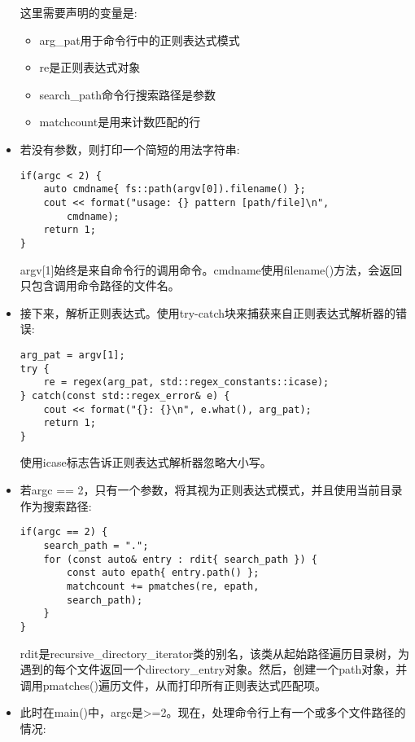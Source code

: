 \begin{itemize}
这里需要声明的变量是:

\begin{itemize}
\item
arg\_pat用于命令行中的正则表达式模式

\item
re是正则表达式对象

\item
search\_path命令行搜索路径是参数

\item
matchcount是用来计数匹配的行
\end{itemize}

\item 
若没有参数，则打印一个简短的用法字符串:

\begin{lstlisting}[style=styleCXX]
if(argc < 2) {
	auto cmdname{ fs::path(argv[0]).filename() };
	cout << format("usage: {} pattern [path/file]\n",
		cmdname);
	return 1;
}
\end{lstlisting}

argv[1]始终是来自命令行的调用命令。cmdname使用filename()方法，会返回只包含调用命令路径的文件名。

\item 
接下来，解析正则表达式。使用try-catch块来捕获来自正则表达式解析器的错误:

\begin{lstlisting}[style=styleCXX]
arg_pat = argv[1];
try {
	re = regex(arg_pat, std::regex_constants::icase);
} catch(const std::regex_error& e) {
	cout << format("{}: {}\n", e.what(), arg_pat);
	return 1;
}
\end{lstlisting}

使用icase标志告诉正则表达式解析器忽略大小写。

\item 
若argc == 2，只有一个参数，将其视为正则表达式模式，并且使用当前目录作为搜索路径:

\begin{lstlisting}[style=styleCXX]
if(argc == 2) {
	search_path = ".";
	for (const auto& entry : rdit{ search_path }) {
		const auto epath{ entry.path() };
		matchcount += pmatches(re, epath,
		search_path);
	}
}
\end{lstlisting}

rdit是recursive\_directory\_iterator类的别名，该类从起始路径遍历目录树，为遇到的每个文件返回一个directory\_entry对象。然后，创建一个path对象，并调用pmatches()遍历文件，从而打印所有正则表达式匹配项。

\item 
此时在main()中，argc是>=2。现在，处理命令行上有一个或多个文件路径的情况:


\end{itemize}
